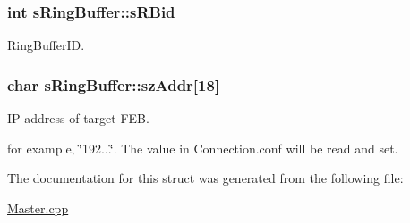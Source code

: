 \subsubsection[{s\+R\+Bid}]{\setlength{\rightskip}{0pt plus 5cm}int s\+Ring\+Buffer\+::s\+R\+Bid}\label{structs_ring_buffer_a86973832a168fb3fb15847da4407e590}


Ring\+Buffer\+I\+D. 

\hypertarget{structs_ring_buffer_a3d8b0121e3a6f4c1657581c5446e67cc}{}
\subsubsection[{sz\+Addr}]{\setlength{\rightskip}{0pt plus 5cm}char s\+Ring\+Buffer\+::sz\+Addr\mbox{[}18\mbox{]}}\label{structs_ring_buffer_a3d8b0121e3a6f4c1657581c5446e67cc}


I\+P address of target F\+E\+B. 

for example, \char`\"{}192...\char`\"{}. The value in Connection.\+conf will be read and set. 

The documentation for this struct was generated from the following file\+:\begin{DoxyCompactItemize}
\item 
\hyperlink{_master_8cpp}{Master.\+cpp}\end{DoxyCompactItemize}
